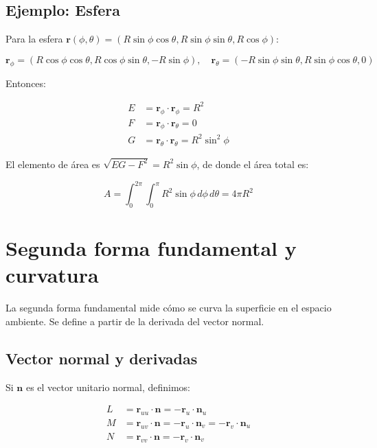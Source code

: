 \documentclass[
]{book}
\begin{document}
\subsection{Ejemplo: Esfera}\label{ejemplo-esfera}

Para la esfera \(\mathbf{r}(\phi, \theta) = (R\sin\phi\cos\theta, R\sin\phi\sin\theta, R\cos\phi)\):

\[
\mathbf{r}_\phi = (R\cos\phi\cos\theta, R\cos\phi\sin\theta, -R\sin\phi), \quad
\mathbf{r}_\theta = (-R\sin\phi\sin\theta, R\sin\phi\cos\theta, 0)
\]

Entonces:

\[
\begin{aligned}
E &= \mathbf{r}_\phi \cdot \mathbf{r}_\phi = R^2 \\
F &= \mathbf{r}_\phi \cdot \mathbf{r}_\theta = 0 \\
G &= \mathbf{r}_\theta \cdot \mathbf{r}_\theta = R^2\sin^2\phi
\end{aligned}
\]

El elemento de área es \(\sqrt{EG - F^2} = R^2\sin\phi\), de donde el área total es:

\[
A = \int_0^{2\pi} \int_0^{\pi} R^2\sin\phi \, d\phi\, d\theta = 4\pi R^2
\]

\section{Segunda forma fundamental y curvatura}\label{segunda-forma-fundamental-y-curvatura}

La segunda forma fundamental mide cómo se curva la superficie en el espacio ambiente. Se define a partir de la derivada del vector normal.

\subsection{Vector normal y derivadas}\label{vector-normal-y-derivadas}

Si \(\mathbf{n}\) es el vector unitario normal, definimos:

\[
\begin{aligned}
L &= \mathbf{r}_{uu} \cdot \mathbf{n} = -\mathbf{r}_u \cdot \mathbf{n}_u \\
M &= \mathbf{r}_{uv} \cdot \mathbf{n} = -\mathbf{r}_u \cdot \mathbf{n}_v = -\mathbf{r}_v \cdot \mathbf{n}_u \\
N &= \mathbf{r}_{vv} \cdot \mathbf{n} = -\mathbf{r}_v \cdot \mathbf{n}_v
\end{aligned}
\]
\end{document}
